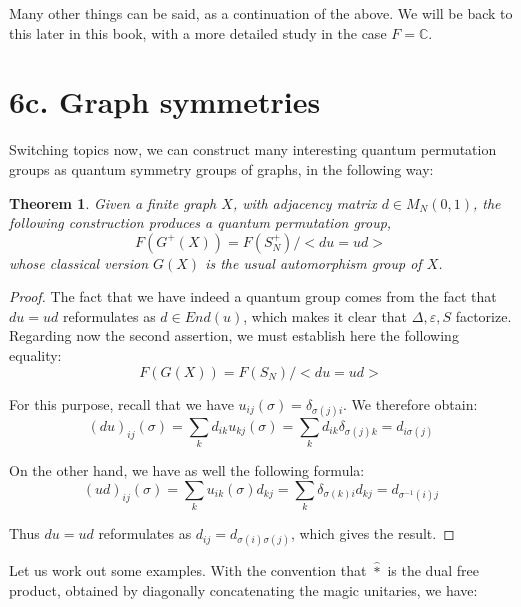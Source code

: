 \documentclass[12pt]{amsbook}
\newtheorem{theorem}{Theorem}[chapter]
\begin{document}
Many other things can be said, as a continuation of the above. We will be back to this later in this book, with a more detailed study in the case $F=\mathbb C$.

\section*{6c. Graph symmetries} 

Switching topics now, we can construct many interesting quantum permutation groups as quantum symmetry groups of graphs, in the following way:


\begin{theorem}
Given a finite graph $X$, with adjacency matrix $d\in M_N(0,1)$, the following construction produces a quantum permutation group, 
$$F(G^+(X))=F(S_N^+)\Big/\Big<du=ud\Big>$$
whose classical version $G(X)$ is the usual  automorphism group of $X$.
\end{theorem}

\begin{proof}
The fact that we have indeed a quantum group comes from the fact that $du=ud$ reformulates as $d\in End(u)$, which makes it clear that $\Delta,\varepsilon,S$ factorize. Regarding now the second assertion, we must establish here the following equality:
$$F(G(X))=F(S_N)\Big/\Big<du=ud\Big>$$

For this purpose, recall that we have $u_{ij}(\sigma)=\delta_{\sigma(j)i}$. We therefore obtain:
$$(du)_{ij}(\sigma)
=\sum_kd_{ik}u_{kj}(\sigma)
=\sum_kd_{ik}\delta_{\sigma(j)k}
=d_{i\sigma(j)}$$

On the other hand, we have as well the following formula:
$$(ud)_{ij}(\sigma)
=\sum_ku_{ik}(\sigma)d_{kj}
=\sum_k\delta_{\sigma(k)i}d_{kj}
=d_{\sigma^{-1}(i)j}$$

Thus $du=ud$ reformulates as $d_{ij}=d_{\sigma(i)\sigma(j)}$, which gives the result.
\end{proof}

Let us work out some examples. With the convention that $\hat{*}$ is the dual free product, obtained by diagonally concatenating the magic unitaries, we have:
\end{document}
